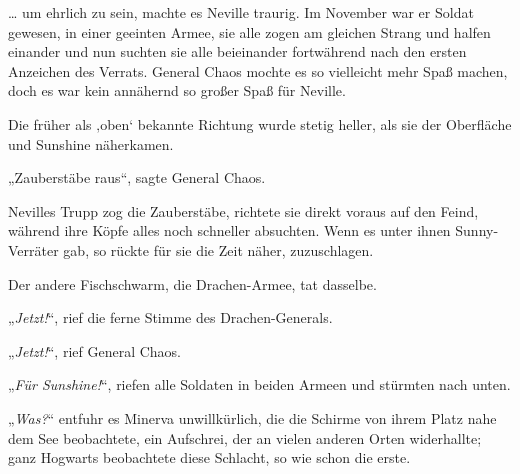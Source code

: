 … um ehrlich zu sein, machte es Neville traurig. Im November war er Soldat gewesen, in einer geeinten Armee, sie alle zogen am gleichen Strang und halfen einander und nun suchten sie alle beieinander fortwährend nach den ersten Anzeichen des Verrats. General Chaos mochte es so vielleicht mehr Spaß machen, doch es war kein annähernd so großer Spaß für Neville.

Die früher als ‚oben‘ bekannte Richtung wurde stetig heller, als sie der Oberfläche und Sunshine näherkamen.

„Zauberstäbe raus“, sagte General Chaos.

Nevilles Trupp zog die Zauberstäbe, richtete sie direkt voraus auf den Feind, während ihre Köpfe alles noch schneller absuchten. Wenn es unter ihnen Sunny-Verräter gab, so rückte für sie die Zeit näher, zuzuschlagen.

Der andere Fischschwarm, die Drachen-Armee, tat dasselbe.

„\emph{Jetzt!}“, rief die ferne Stimme des Drachen-Generals.

„\emph{Jetzt!}“, rief General Chaos.

„\emph{Für Sunshine!}“, riefen alle Soldaten in beiden Armeen und stürmten nach unten.

\later

„\emph{Was?}“ entfuhr es Minerva unwillkürlich, die die Schirme von ihrem Platz nahe dem See beobachtete, ein Aufschrei, der an vielen anderen Orten widerhallte; ganz Hogwarts beobachtete diese Schlacht, so wie schon die erste.

